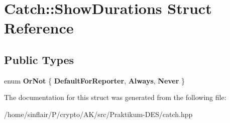 \hypertarget{structCatch_1_1ShowDurations}{}\section{Catch\+:\+:Show\+Durations Struct Reference}
\label{structCatch_1_1ShowDurations}
\subsection*{Public Types}
\begin{DoxyCompactItemize}
\item 
\mbox{\label{structCatch_1_1ShowDurations_a82fa0174554187220c1eda175f122ee1}} 
enum {\bfseries Or\+Not} \{ {\bfseries Default\+For\+Reporter}, 
{\bfseries Always}, 
{\bfseries Never}
 \}
\end{DoxyCompactItemize}


The documentation for this struct was generated from the following file\+:\begin{DoxyCompactItemize}
\item 
/home/sinflair/\+P/crypto/\+A\+K/src/\+Praktikum-\/\+D\+E\+S/catch.\+hpp\end{DoxyCompactItemize}
